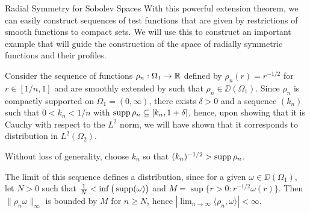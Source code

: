 \begin{chapter}{Radial Symmetry for Sobolev Spaces}
With this powerful extension theorem, we can easily construct sequences of test functions that are given by restrictions of smooth functions to compact sets.
We will use this to construct an important example that will guide the construction of the space of radially symmetric functions and their profiles.

Consider the sequence of functions $\rho_n:\Omega_1 \to \mathbb R$ defined by $\rho_n(r) = r^{-1/2}$ for $r\in [1/n,1]$ and are smoothly extended  by  such that $\rho_n \in \DD(\Omega_1)$.
Since $\rho_n$ is compactly supported on $\Omega_1 = (0,\infty)$, there exists $\delta>0$ and a sequence $(k_n)$ such that $0<k_n<1/n$ with $\operatorname*{supp} \rho_n \subseteq \left[k_n,1+\delta\right]$, hence, upon showing that it is Cauchy with respect to the $L^2$ norm, we will have shown that it corresponds to distribution in $L^2(\Omega_2)$.
\begin{com}
Without loss of generality, choose $k_n$ so that $(k_n)^{-1/2} > \operatorname*{supp} \rho_n$.
\end{com}
The limit of this sequence defines a distribution, since for a given $\omega \in \DD(\Omega_1)$, let $N>0$ such that $\frac 1N < \inf \big(\operatorname*{supp} (\omega)\big)$ and $M = \sup \{r>0:r^{-1/2}\omega(r)\}$. 
Then $\|\rho_n \omega \|_{\infty}$ is bounded by $M$ for $n\ge N$, hence $\displaystyle{\left|\lim_{n\to\infty} \langle \rho_n,\omega\rangle\right| < \infty}$.


\end{chapter}

